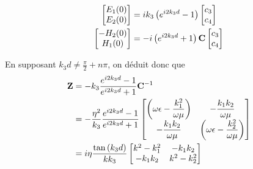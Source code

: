 \begin{align}
    \begin{bmatrix}
        E_1(0)\\
        E_2(0)\\
    \end{bmatrix}
    &=ik_3\left( e^{i2k_3 d} -1 \right)
    \begin{bmatrix}
        c_3 \\
        c_4
    \end{bmatrix} \\
    \begin{bmatrix}
        -H_2(0)\\
        H_1(0)\\
    \end{bmatrix}
    & = - i\left(e^{i2k_3 d} +1 \right)
    \mathbf{C}
    \begin{bmatrix}
    c_3 \\
    c_4
    \end{bmatrix}
\end{align}

En supposant $k_3d \not = \frac{\pi}{2} + n\pi$, on déduit donc que
\begin{align}
    \mathbf{Z} &=  - k_3 \dfrac{e^{i2k_3d} -1}{e^{i2k_3d} +1} \mathbf{C}^{-1} 
    \\
    &= -\dfrac{\eta^2}{k_3} \dfrac{e^{i2k_3d} -1}{e^{i2k_3d} +1}
        \begin{bmatrix}
           \left(\omega\epsilon-\dfrac{k_1^2}{\omega\mu}\right)  & -\dfrac{k_1k_2}{\omega\mu}\\
            -\dfrac{k_1k_2}{\omega\mu} &  \left(\omega\epsilon-\dfrac{k_2^2}{\omega\mu}\right)
        \end{bmatrix}
    \\
    &= i\eta\dfrac{\tan\left(k_3d\right)}{kk_3}
        \begin{bmatrix}
           k^2-k_1^2  & -k_1k_2\\
            -k_1k_2 & k^2-k_2^2\\
        \end{bmatrix}
\end{align}


